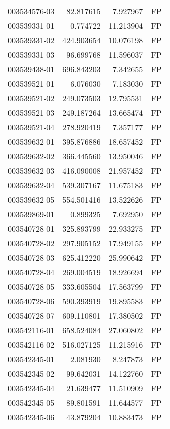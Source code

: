 \begin{tabular}{lrrl}
003534576-03 &   82.817615 &     7.927967 &   FP \\
003539331-01 &    0.774722 &    11.213904 &   FP \\
003539331-02 &  424.903654 &    10.076198 &   FP \\
003539331-03 &   96.699768 &    11.596037 &   FP \\
003539438-01 &  696.843203 &     7.342655 &   FP \\
003539521-01 &    6.076030 &     7.183030 &   FP \\
003539521-02 &  249.073503 &    12.795531 &   FP \\
003539521-03 &  249.187264 &    13.665474 &   FP \\
003539521-04 &  278.920419 &     7.357177 &   FP \\
003539632-01 &  395.876886 &    18.657452 &   FP \\
003539632-02 &  366.445560 &    13.950046 &   FP \\
003539632-03 &  416.090008 &    21.957452 &   FP \\
003539632-04 &  539.307167 &    11.675183 &   FP \\
003539632-05 &  554.501416 &    13.522626 &   FP \\
003539869-01 &    0.899325 &     7.692950 &   FP \\
003540728-01 &  325.893799 &    22.933275 &   FP \\
003540728-02 &  297.905152 &    17.949155 &   FP \\
003540728-03 &  625.412220 &    25.990642 &   FP \\
003540728-04 &  269.004519 &    18.926694 &   FP \\
003540728-05 &  333.605504 &    17.563799 &   FP \\
003540728-06 &  590.393919 &    19.895583 &   FP \\
003540728-07 &  609.110801 &    17.380502 &   FP \\
003542116-01 &  658.524084 &    27.060802 &   FP \\
003542116-02 &  516.027125 &    11.215916 &   FP \\
003542345-01 &    2.081930 &     8.247873 &   FP \\
003542345-02 &   99.642031 &    14.122760 &   FP \\
003542345-04 &   21.639477 &    11.510909 &   FP \\
003542345-05 &   89.801591 &    11.644577 &   FP \\
003542345-06 &   43.879204 &    10.883473 &   FP \\

\end{tabular}
